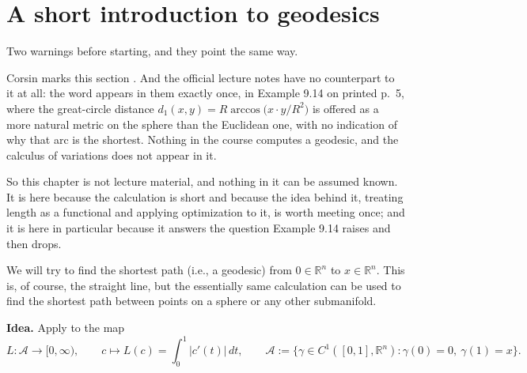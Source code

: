 

\section{A short introduction to geodesics}
\label{sec:geodesics}

\begin{ainote}
\label{ainote:geodesics_beyond_the_course}
Two warnings before starting, and they point the same way.

Corsin marks this section . And the official lecture notes have no
counterpart to it at all: the word  appears in them exactly once, in
Example 9.14 on printed p.\ 5, where the great-circle distance
$d_1(x,y) = R\arccos\big(x\cdot y/R^2\big)$ is offered as a more natural metric on the sphere
than the Euclidean one, with no indication of why that arc is the shortest. Nothing in the
course computes a geodesic, and the calculus of variations does not appear in it.

So this chapter is not lecture material, and nothing in it can be assumed known. It is here
because the calculation is short and because the idea behind it, treating length as a functional
and applying optimization to it, is worth meeting once; and it is here in particular because it
answers the question Example 9.14 raises and then drops.
\end{ainote}

We will try to find the shortest path (i.e., a geodesic) from $0 \in \mathbb{R}^n$ to $x \in \mathbb{R}^n$. This
is, of course, the straight line, but the essentially same calculation can be used to find the
shortest path between points on a sphere or any other submanifold.

\textbf{Idea.} Apply  to the map
\[L : \mathcal A \to [0,\infty), \qquad c \mapsto L(c) = \int_0^1 \lvert c'(t)\rvert\,dt,
  \qquad \mathcal A := \{\gamma \in C^1([0,1],\mathbb{R}^n) : \gamma(0)=0,\ \gamma(1)=x\}.\]

